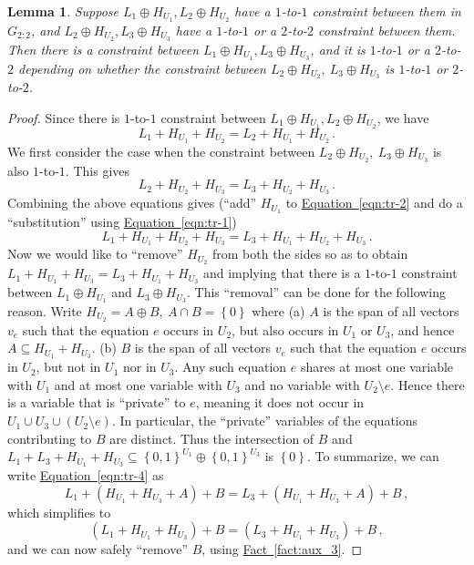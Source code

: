 \documentclass[11pt]{article}
\numberwithin{equation}{section}
\newtheorem{lemma}[theorem]{Lemma}
\theoremstyle{definition}
\theoremstyle{plain}
\newcommand{\expref}[2]{\hyperref[#2]{#1~\ref{#2}}}
\newcommand{\expeqref}[2]{\hyperref[#2]{#1~\eqref{#2}}}
\newcommand\set[1]{{\left\{ #1 \right\}}}
\newcommand\power[1]{\set{0,1}^{#1}}
\newcommand*\xor{\mathbin{\oplus}}
\begin{document}
\begin{lemma}\label{lemma:transitive}
Suppose $L_1\xor H_{U_1}, L_2\xor H_{U_2}$ have a $1$-to-$1$ constraint between them in $G_{2:2}$, and
$L_2\xor H_{U_2}, L_3\xor H_{U_3}$ have a $1$-to-$1$ or a $2$-to-$2$ constraint between them.
Then there is a constraint
between $L_1\xor H_{U_1}, L_3\xor H_{U_3}$, and it is  $1$-to-$1$ or a $2$-to-$2$ depending on whether
the constraint between $L_2\xor H_{U_2}, ~L_3\xor H_{U_3}$ is $1$-to-$1$ or $2$-to-$2$.
%
%
\end{lemma}
\begin{proof}
Since there is $1$-to-$1$ constraint between $L_1\xor H_{U_1}, L_2\xor H_{U_2}$, we have
\begin{equation} \label{eqn:tr-1}
L_1+ H_{U_1}+ H_{U_2} = L_2+ H_{U_1}+ H_{U_2}\,.%
\end{equation}
We first consider the case when the constraint between $L_2\xor H_{U_2}, ~L_3\xor H_{U_3}$ is also $1$-to-$1$. This gives
\begin{equation}\label{eqn:tr-2}
L_2+ H_{U_2}+ H_{U_3} = L_3+ H_{U_2}+ H_{U_3}\,.%
\end{equation}
Combining the above equations gives (``add'' $H_{U_1}$ to \expeqref{Equation}{eqn:tr-2} and do a ``substitution'' using \expeqref{Equation}{eqn:tr-1})
%
\begin{equation}\label{eqn:tr-4}
L_1 + H_{U_1} +  H_{U_2} + H_{U_3} = L_3 + H_{U_1} +  H_{U_2} + H_{U_3}\,.%
\end{equation}
Now we would like to ``remove'' $H_{U_2}$ from both the sides so as to obtain $L_1 + H_{U_1} +  H_{U_3} = L_3 + H_{U_1} +  H_{U_3}$ and
implying that there is a $1$-to-$1$ constraint between $L_1\xor H_{U_1}$ and $L_3\xor H_{U_3}$. This ``removal'' can be done for the following
reason. Write $H_{U_2} = A \xor B, ~A \cap B = \set{0}$ where (a) $A$ is the span of all vectors $v_e$ such that the equation $e$ occurs in $U_2$, but also occurs
 in $U_1$ or  $U_3$, and hence $A \subseteq H_{U_1} + H_{U_3}$. (b) $B$ is the span of all vectors $v_e$ such that the equation $e$ occurs
in $U_2$, but not in $U_1$ nor in $U_3$. Any such equation $e$ shares at most one variable with $U_1$ and at most one variable with $U_3$ and no
variable with $U_2 \setminus e$. Hence there is a variable that is ``private'' to $e$, meaning it does not occur in $U_1 \cup U_3 \cup (U_2 \setminus e)$.
In particular, the ``private'' variables of the equations contributing to $B$
are distinct. Thus the intersection of
$B$ and $L_1+ L_3+ H_{U_1}+ H_{U_3} \subseteq \power{U_1}\xor \power{U_3}$
is $\set{0}$. To summarize, we can write \expeqref{Equation}{eqn:tr-4} as
\[
L_1 + \left( H_{U_1} + H_{U_3} +  A\right) + B  = L_3 + \left( H_{U_1} + H_{U_3} + A\right)  + B\,,%
\]
which simplifies to
\[
\left( L_1 + H_{U_1} + H_{U_3}\right)  + B  = \left( L_3 +  H_{U_1} + H_{U_3}\right)  + B\,,%
\]
and we can now safely ``remove'' $B$, using \expref{Fact}{fact:aux_3}.


\end{proof}
\end{document}
